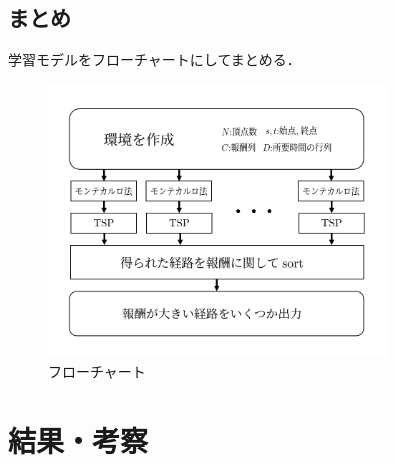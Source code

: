 \documentclass[a4paper,12pt]{jsreport}
\theoremstyle{definition}
\begin{document}
\section{まとめ}
学習モデルをフローチャートにしてまとめる．
\begin{figure}[h]
    \centering
    \includegraphics[width=9cm]{model.png}
    \caption{フローチャート}
    \label{fig:model}
\end{figure}

\chapter{結果・考察}
\end{document}

